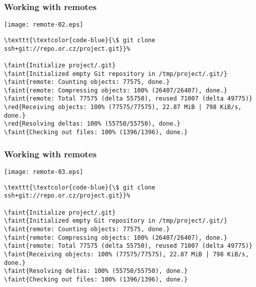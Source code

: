 \documentclass[english]{beamer}
\newcommand{\CMD}[1]{%
\texttt{\textcolor{code-blue}{#1}}%
}
\newcommand{\faint}[1]{%
\textcolor{code-gray}{#1}%
}
\newcommand{\red}[1]{%
\textcolor{code-red}{#1}%
}
\begin{document}
\begin{frame}[fragile]
\frametitle{Working with remotes}

\texttt{[image: remote-02.eps]}

{\tiny
\begin{Verbatim}[commandchars=\\\{\}]
\CMD{\$ git clone ssh+git://repo.or.cz/project.git}
\faint{Initialize project/.git}
\faint{Initialized empty Git repository in /tmp/project/.git/}
\faint{remote: Counting objects: 77575, done.}
\faint{remote: Compressing objects: 100% (26407/26407), done.}
\faint{remote: Total 77575 (delta 55750), reused 71007 (delta 49775)}
\red{Receiving objects: 100% (77575/77575), 22.87 MiB | 798 KiB/s, done.}
\red{Resolving deltas: 100% (55750/55750), done.}
\faint{Checking out files: 100% (1396/1396), done.}
\end{Verbatim}
}
\vspace{\textheight}
\end{frame}

\begin{frame}[fragile]
\frametitle{Working with remotes}

\texttt{[image: remote-03.eps]}

{\tiny
\begin{Verbatim}[commandchars=\\\{\}]
\CMD{\$ git clone ssh+git://repo.or.cz/project.git}
\faint{Initialize project/.git}
\faint{Initialized empty Git repository in /tmp/project/.git/}
\faint{remote: Counting objects: 77575, done.}
\faint{remote: Compressing objects: 100% (26407/26407), done.}
\faint{remote: Total 77575 (delta 55750), reused 71007 (delta 49775)}
\faint{Receiving objects: 100% (77575/77575), 22.87 MiB | 798 KiB/s, done.}
\faint{Resolving deltas: 100% (55750/55750), done.}
\faint{Checking out files: 100% (1396/1396), done.}
\end{Verbatim}
}
\vspace{\textheight}
\end{frame}
\end{document}

